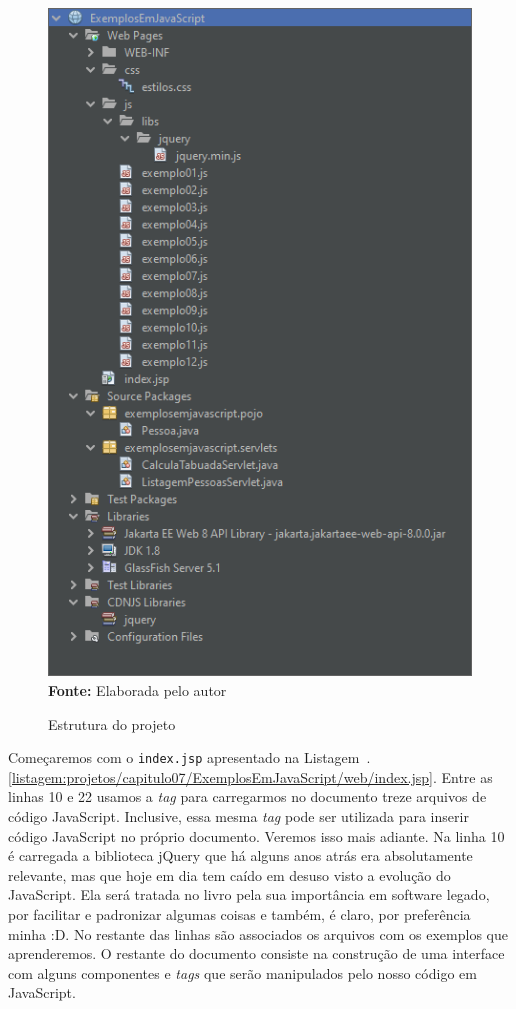 \FloatBarrier
\begin{figure}[!htbp]
    \centering
    \caption{Estrutura do projeto}
    \includegraphics[scale=0.7]{imagens/cap07EstruturaDoProjeto}
    \\\textbf{Fonte:} Elaborada pelo autor
    \label{fig:cap07EstruturaDoProjeto}
\end{figure}
\FloatBarrier

Começaremos com o \texttt{index.jsp} apresentado na Listagem~\thechapter.\ref{listagem:projetos/capitulo07/ExemplosEmJavaScript/web/index.jsp}. Entre as linhas 10 e 22 usamos a \textit{tag}  para carregarmos no documento treze arquivos de código JavaScript. Inclusive, essa mesma \textit{tag} pode ser utilizada para inserir código JavaScript no próprio documento. Veremos isso mais adiante. Na linha 10 é carregada a biblioteca jQuery que há alguns anos atrás era absolutamente relevante, mas que hoje em dia tem caído em desuso visto a evolução do JavaScript. Ela será tratada no livro pela sua importância em software legado, por facilitar e padronizar algumas coisas e também, é claro, por preferência minha :D. No restante das linhas são associados os arquivos com os exemplos que aprenderemos. O restante do documento consiste na construção de uma interface com alguns componentes e \textit{tags} que serão manipulados pelo nosso código em JavaScript. 

